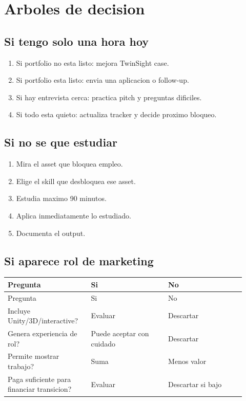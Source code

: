 \chapter{Arboles de decision}

\section{Si tengo solo una hora hoy}


\begin{enumerate}
\item Si portfolio no esta listo: mejora TwinSight case.
\item Si portfolio esta listo: envia una aplicacion o follow-up.
\item Si hay entrevista cerca: practica pitch y preguntas dificiles.
\item Si todo esta quieto: actualiza tracker y decide proximo bloqueo.
\end{enumerate}


\section{Si no se que estudiar}


\begin{enumerate}
\item Mira el asset que bloquea empleo.
\item Elige el skill que desbloquea ese asset.
\item Estudia maximo 90 minutos.
\item Aplica inmediatamente lo estudiado.
\item Documenta el output.
\end{enumerate}


\section{Si aparece rol de marketing}


\begin{center}
\scriptsize
\begin{longtable}{>{\raggedright\arraybackslash}p{0.305\linewidth} >{\raggedright\arraybackslash}p{0.305\linewidth} >{\raggedright\arraybackslash}p{0.305\linewidth}}
\toprule
Pregunta & Si & No \\
\midrule
\endfirsthead
\toprule
Pregunta & Si & No \\
\midrule
\endhead
Incluye Unity/3D/interactive? & Evaluar & Descartar \\
Genera experiencia de rol? & Puede aceptar con cuidado & Descartar \\
Permite mostrar trabajo? & Suma & Menos valor \\
Paga suficiente para financiar transicion? & Evaluar & Descartar si bajo \\
\bottomrule
\end{longtable}
\end{center}



